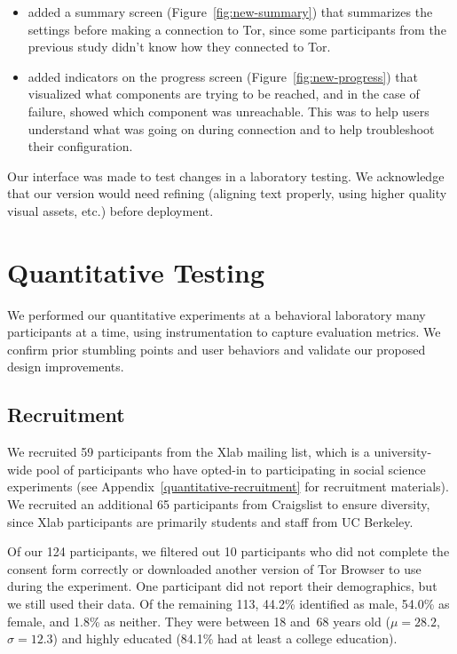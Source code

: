 \documentclass[USenglish,oneside,twocolumn]{article}
\begin{document}
\begin{itemize}
\item{added a summary screen (Figure~\ref{fig:new-summary}) that summarizes the settings before making a connection to Tor, since some participants from the previous study didn't know how they connected to Tor.}
\item{added indicators on the progress screen (Figure~\ref{fig:new-progress}) that visualized what components are trying to be reached, and in the case of failure, showed which component was unreachable. This was to help users understand what was going on during  connection and to help troubleshoot their configuration.}
\end{itemize} 

Our interface was made to test changes in a laboratory testing. We acknowledge that our version would need refining (aligning text properly, using higher quality visual assets, etc.) before deployment. 

\section{Quantitative Testing}
\label{sec:quantitative}
We performed our quantitative experiments at a behavioral laboratory many participants at a time, using instrumentation to capture evaluation metrics. We confirm prior stumbling points and user behaviors and validate our proposed design improvements.

\subsection{Recruitment}
We recruited 59 participants from the Xlab mailing list, which is a university-wide pool of participants who have opted-in to participating in social science experiments (see Appendix~\ref{quantitative-recruitment} for recruitment materials). We recruited an additional 65 participants from Craigslist to ensure diversity, since Xlab participants are primarily students and staff from UC Berkeley.

Of our 124 participants, we filtered out 10 participants who did not complete the consent form correctly or downloaded another version of Tor Browser to use during the experiment. One participant did not report their demographics, but we still used their data. Of the remaining 113, 44.2\% identified as male, 54.0\% as female, and 1.8\% as neither. They were between 18 and~68 years old ($\mu = 28.2$, $\sigma = 12.3$) and highly educated (84.1\% had at least a college education). 
\end{document}
